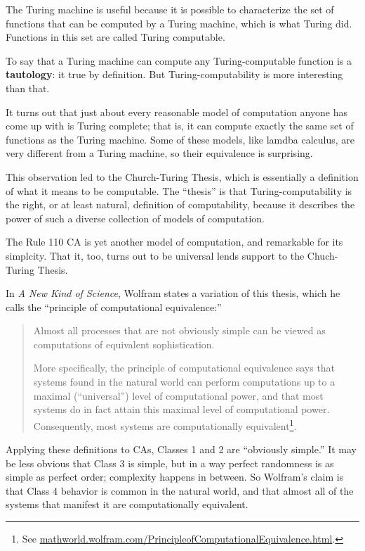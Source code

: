 \documentclass[10pt]{book}
\begin{document}
The Turing machine is useful because it is possible to characterize
the set of functions that can be computed by a Turing machine,
which is what Turing did.  Functions in this set are
called Turing computable.

To say that a Turing machine can compute any Turing-computable
function is a {\bf tautology}: it true by definition.  But
Turing-computability is more interesting than that.

It turns out that just about every reasonable model of computation
anyone has come up with is Turing complete; that is, it can compute
exactly the same set of functions as the Turing machine.
Some of these models, like lamdba calculus, are very different
from a Turing machine, so their equivalence is surprising.

This observation led to the Church-Turing Thesis, which is essentially
a definition of what it means to be computable.  The ``thesis'' is
that Turing-computability is the right, or at least natural,
definition of computability, because it describes the power of such a
diverse collection of models of computation.

The Rule 110 CA is yet another model of computation, and remarkable
for its simplcity.  That it, too, turns out to be universal lends
support to the Chuch-Turing Thesis.

In {\em A New Kind of Science}, Wolfram states a variation of this
thesis, which he calls the ``principle of computational equivalence:''

\begin{quote}
Almost all processes that are not obviously simple can be viewed as
computations of equivalent sophistication.

More specifically, the principle of computational equivalence says
that systems found in the natural world can perform computations up to
a maximal (``universal'') level of computational power, and that most
systems do in fact attain this maximal level of computational
power. Consequently, most systems are computationally
equivalent\footnote{See
  \url{mathworld.wolfram.com/PrincipleofComputationalEquivalence.html}.}.
\end{quote}

Applying these definitions to CAs, Classes 1 and 2 are ``obviously
simple.''  It may be less obvious that Class 3 is simple, but in a way
perfect randomness is as simple as perfect order; complexity happens
in between.  So Wolfram's claim is that Class 4 behavior is common in
the natural world, and that almost all of the systems that manifest it
are computationally equivalent.
\end{document}
